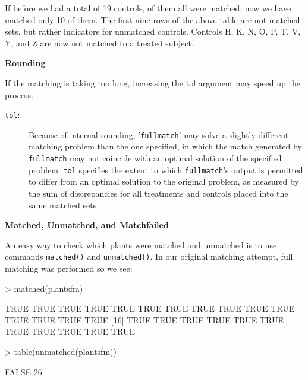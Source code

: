 \documentclass[12pt,twoside]{article}
\begin{document}
{{{\bigskip

{\ttfamily
\textrm{If before we had a total of 19 controls, of them all were
matched, now we have matched only 10 of them. The first nine rows of
the above table are not matched sets, but rather indicators for
unmatched controls. Controls H, K, N, O, P, T, V, Y, and Z are now not
matched to a treated subject. }}


\bigskip

{\rmfamily\bfseries
Rounding}


\bigskip

{\ttfamily
\textrm{If the matching is taking too long, increasing the }tol\textrm{
argument may speed up the process.}}


\bigskip

\begin{description}
\item[\texttt{tol}:] Because of internal rounding,
'\texttt{fullmatch}' may solve a slightly different matching
problem than the one specified, in which the match generated by
\texttt{fullmatch} may not coincide with an optimal solution of
the specified problem.  \texttt{tol} specifies the extent to
which \texttt{fullmatch}'s output is permitted to differ from an
optimal solution to the original problem, as measured by the sum
of discrepancies for all treatments and controls placed into the
same matched sets.
\end{description}

\bigskip

{\rmfamily\bfseries
Matched, Unmatched, and Matchfailed}


\bigskip

{\ttfamily \textrm{ An easy way to check
which plants were matched and unmatched is to use commands
}\texttt{matched()}\textrm{ and }\texttt{unmatched()}\textrm{. In
our original matching attempt, full matching was performed so we
see:}}


\bigskip
\begin{Schunk}
\begin{Sinput}
> matched(plantsfm)
\end{Sinput}
\begin{Soutput}
 [1] TRUE TRUE TRUE TRUE TRUE TRUE TRUE TRUE TRUE TRUE TRUE TRUE TRUE TRUE TRUE
[16] TRUE TRUE TRUE TRUE TRUE TRUE TRUE TRUE TRUE TRUE TRUE
\end{Soutput}
\begin{Sinput}
> table(unmatched(plantsfm))
\end{Sinput}
\begin{Soutput}
FALSE 
   26 
\end{Soutput}
\end{Schunk}

}}}
\end{document}
